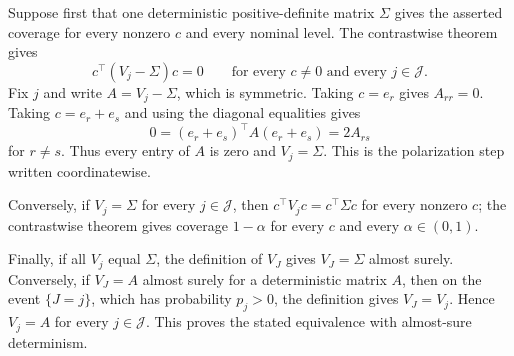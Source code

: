 Suppose first that one deterministic positive-definite matrix \(\Sigma\) gives the asserted coverage for every nonzero \(c\) and every nominal level. The contrastwise theorem gives
\[
 c^\top(V_j-\Sigma)c=0
 \qquad\text{for every }c\ne0\text{ and every }j\in\mathcal J.
\]
Fix \(j\) and write \(A=V_j-\Sigma\), which is symmetric. Taking \(c=e_r\) gives \(A_{rr}=0\). Taking \(c=e_r+e_s\) and using the diagonal equalities gives
\[
 0=(e_r+e_s)^\top A(e_r+e_s)=2A_{rs}
\]
for \(r\ne s\). Thus every entry of \(A\) is zero and \(V_j=\Sigma\). This is the polarization step written coordinatewise.

Conversely, if \(V_j=\Sigma\) for every \(j\in\mathcal J\), then \(c^\top V_jc=c^\top\Sigma c\) for every nonzero \(c\); the contrastwise theorem gives coverage \(1-\alpha\) for every \(c\) and every \(\alpha\in(0,1)\).

Finally, if all \(V_j\) equal \(\Sigma\), the definition of \(V_J\) gives \(V_J=\Sigma\) almost surely. Conversely, if \(V_J=A\) almost surely for a deterministic matrix \(A\), then on the event \(\{J=j\}\), which has probability \(p_j>0\), the definition gives \(V_J=V_j\). Hence \(V_j=A\) for every \(j\in\mathcal J\). This proves the stated equivalence with almost-sure determinism.